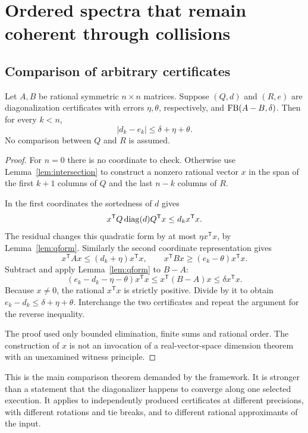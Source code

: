 \section{Ordered spectra that remain coherent through collisions}
\label{sec:spectra}

\subsection{Comparison of arbitrary certificates}

\begin{theorem}
\label{thm:weyl}
Let $A,B$ be rational symmetric $n\times n$ matrices. Suppose $(Q,d)$ and $(R,e)$ are diagonalization certificates with errors $\eta,\theta$, respectively, and $\operatorname{FB}(A-B,\delta)$. Then for every $k<n$,
\begin{equation}
 |d_k-e_k|\le\delta+\eta+\theta. \label{eq:weyl}
\end{equation}
No comparison between $Q$ and $R$ is assumed.
\end{theorem}
\begin{proof}
For $n=0$ there is no coordinate to check. Otherwise use Lemma~\ref{lem:intersection} to construct a nonzero rational vector $x$ in the span of the first $k+1$ columns of $Q$ and the last $n-k$ columns of $R$.

In the first coordinates the sortedness of $d$ gives
\[
 x^{\mathsf T}Q\operatorname{diag}(d)Q^{\mathsf T}x\le d_k x^{\mathsf T}x.
\]
The residual changes this quadratic form by at most $\eta x^{\mathsf T}x$, by Lemma~\ref{lem:qform}. Similarly the second coordinate representation gives
\[
 x^{\mathsf T}Ax\le(d_k+\eta)x^{\mathsf T}x,
 \qquad
 x^{\mathsf T}Bx\ge(e_k-\theta)x^{\mathsf T}x.
\]
Subtract and apply Lemma~\ref{lem:qform} to $B-A$:
\[
 (e_k-d_k-\eta-\theta)x^{\mathsf T}x
 \le x^{\mathsf T}(B-A)x\le\delta x^{\mathsf T}x.
\]
Because $x\ne0$, the rational $x^{\mathsf T}x$ is strictly positive. Divide by it to obtain $e_k-d_k\le\delta+\eta+\theta$. Interchange the two certificates and repeat the argument for the reverse inequality.

The proof used only bounded elimination, finite sums and rational order. The construction of $x$ is not an invocation of a real-vector-space dimension theorem with an unexamined witness principle.
\end{proof}

This is the main comparison theorem demanded by the framework. It is stronger than a statement that the diagonalizer happens to converge along one selected execution. It applies to independently produced certificates at different precisions, with different rotations and tie breaks, and to different rational approximants of the input.

